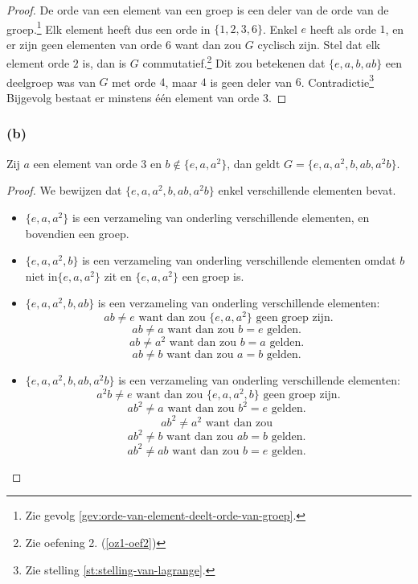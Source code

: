 \documentclass[main.tex]{subfiles}
\begin{document}
\begin{proof}
De orde van een element van een groep is een deler van de orde van de groep.\footnote{Zie gevolg \ref {gev:orde-van-element-deelt-orde-van-groep}.}
Elk element heeft dus een orde in $\{ 1, 2, 3, 6 \}$.
Enkel $e$ heeft als orde $1$, en er zijn geen elementen van orde $6$ want dan zou $G$ cyclisch zijn.
Stel dat elk element orde $2$ is, dan is $G$ commutatief.\footnote{Zie oefening 2. (\ref{oz1-oef2})}
Dit zou betekenen dat $\{ e,a,b,ab \}$ een deelgroep was van $G$ met orde $4$, maar $4$ is geen deler van $6$. Contradictie\footnote{Zie stelling \ref{st:stelling-van-lagrange}.}
Bijgevolg bestaat er minstens \'e\'en element van orde 3.
\end{proof}

\subsubsection{(b)}
Zij $a$ een element van orde $3$ en $b \not\in \{ e,a,a^{2} \}$, dan geldt $G= \{ e,a,a^{2},b,ab,a^{2}b \}$.

\begin{proof}
  We bewijzen dat $\{ e,a,a^{2},b,ab,a^{2}b \}$ enkel verschillende elementen bevat.
  \begin{itemize}
  \item $\{ e,a,a^{2} \}$ is een verzameling van onderling verschillende elementen, en bovendien een groep.
  \item $\{ e,a,a^{2},b \}$ is een verzameling van onderling verschillende elementen omdat $b$ niet in$\{ e,a,a^{2} \}$ zit en $\{ e,a,a^{2} \}$ een groep is.
  \item $\{ e,a,a^{2},b,ab \}$ is een verzameling van onderling verschillende elementen:
    \[ ab \neq e \text{ want dan zou } \{ e,a,a^{2} \} \text{ geen groep zijn.} \]
    \[ ab \neq a \text{ want dan zou } b = e \text{ gelden. } \]
    \[ ab \neq a^{2} \text{ want dan zou } b = a \text{ gelden. } \]
    \[ ab \neq b \text{ want dan zou } a = b \text{ gelden. } \]
  \item $\{ e,a,a^{2},b,ab,a^{2}b \}$ is een verzameling van onderling verschillende elementen:
    \[ a^{2}b \neq e \text{ want dan zou } \{ e,a,a^{2},b \} \text{ geen groep zijn.} \]
    \[ ab^{2} \neq a \text{ want dan zou } b^{2} = e \text{ gelden. } \]
    \[ ab^{2} \neq a^{2} \text{ want dan zou }  \]
    \[ ab^{2} \neq b \text{ want dan zou } ab = b \text{ gelden. } \]
    \[ ab^{2} \neq ab \text{ want dan zou } b = e \text{ gelden. } \]
  \end{itemize}
  
\end{proof}
\end{document}
